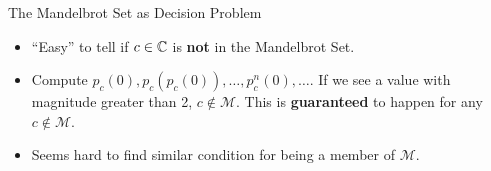 \documentclass[c]{beamer}
\begin{document}
\begin{frame}{The Mandelbrot Set as Decision Problem}
  
  \begin{itemize}
  \item[] ``Easy'' to tell if $c \in \mathbb{C}$ is \textbf{not} in
    the Mandelbrot Set.

    \vspace{\baselineskip}

  \item[] Compute $p_c(0), p_c(p_c(0)), \ldots, p_c^n(0), \ldots$. If
    we see a value with magnitude greater than 2, $c \notin
    \mathcal{M}$.  This is \textbf{guaranteed} to happen for any $c
    \notin \mathcal{M}$.

    \vspace{\baselineskip}

  \item[] Seems hard to find similar condition for being a member of
    $\mathcal{M}$.

  \end{itemize}
\end{frame}
\end{document}
